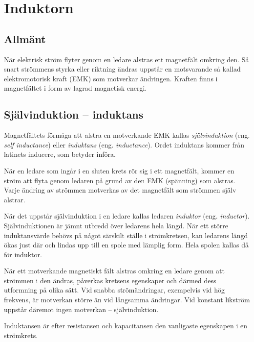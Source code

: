 \section{Induktorn}

\subsection{Allmänt}

När elektrisk ström flyter genom en ledare alstras ett magnetfält omkring
den. Så snart strömmens styrka eller riktning ändras uppstår en motsvarande
så kallad elektromotorisk kraft (EMK) som motverkar ändringen. Kraften finns i
magnetfältet i form av lagrad magnetisk energi.


\subsection{Självinduktion -- induktans}

Magnetfältets förmåga att alstra en motverkande EMK kallas
\emph{självinduktion} (eng. \emph{self inductance}) eller
\emph{induktans} (eng. \emph{inductance}).
Ordet induktans kommer från latinets inducere, som betyder införa.

När en ledare som ingår i en sluten krets rör sig i ett magnetfält, kommer
en ström att flyta genom ledaren på grund av den EMK (spänning) som alstras.
Varje ändring av strömmen motverkas av det magnetfält som strömmen själv
alstrar.

När det uppstår självinduktion i en ledare kallas ledaren \emph{induktor}
(eng. \emph{inductor}).
Självinduktionen är jämnt utbredd över ledarens hela längd. När ett större
induktansvärde behövs på något särskilt ställe i strömkretsen, kan ledarens
längd ökas just där och lindas upp till en spole med lämplig form.
Hela spolen kallas då för induktor.

När ett motverkande magnetiskt fält alstras omkring en ledare genom att strömmen 
i den ändras, påverkas kretsens egenskaper och därmed dess utformning på olika sätt.
Vid snabba strömändringar, exempelvis vid hög frekvens, är motverkan större än vid
långsamma ändringar.
Vid konstant likström uppstår däremot ingen motverkan -- självinduktion.

Induktansen är efter resistansen och kapacitansen den vanligaste egenskapen i
en strömkrets.

